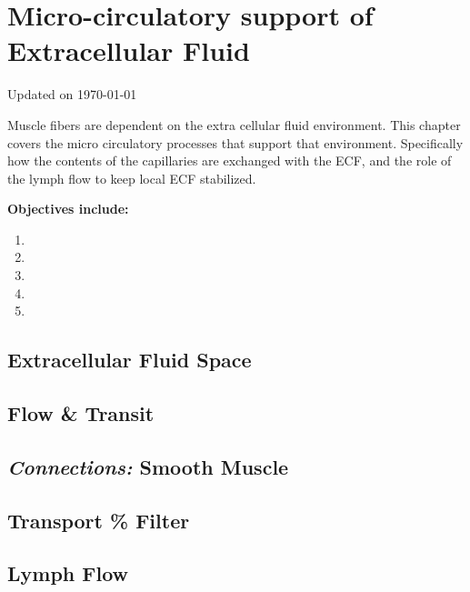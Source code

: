 \chapter{Micro-circulatory support of Extracellular Fluid}\label{chp:ecf_microcirculation}
Updated on \today
\minitoc


Muscle fibers are dependent on the extra cellular fluid environment. This chapter covers the micro circulatory processes that support that environment. Specifically how the contents of the capillaries are exchanged with the ECF, and the role of the lymph flow to keep local ECF stabilized.

\vspace{5mm}

\textbf{Objectives include:}
\begin{enumerate}
    \item
    \item
    \item
    \item
    \item
\end{enumerate}

\section{Extracellular Fluid Space}

\section{Flow \& Transit}

\section{\textit{Connections:} Smooth Muscle}

\section{Transport \% Filter}

\section{Lymph Flow}

\printbibliography[heading=subbibintoc]
